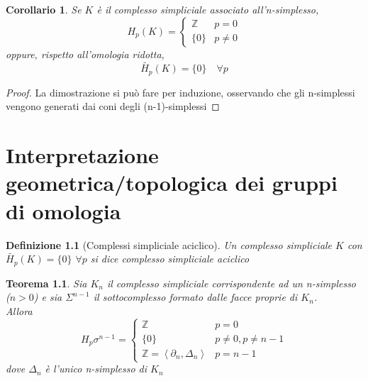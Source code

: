 \documentclass[a4paper]{report}
\newtheorem{theorem}{Teorema}
\newtheorem{definition}{Definizione}
\newtheorem{corollary}{Corollario}
\newcommand{\Z}{\ensuremath{\mathbb{Z}}}
\newcommand{\gen}[1]{\ensuremath{\left<{#1}\right>}}
\begin{document}
\begin{corollary}
    Se $K$ è il complesso simpliciale associato all'n-simplesso,
    \[
        H_p(K)=\begin{cases}
            \Z    & p=0     \\
            \{0\} & p\neq 0
        \end{cases}
    \]
    oppure, rispetto all'omologia ridotta,
    \[
        \tilde{H_p}(K)=\{0\}\quad \forall p
    \]
\end{corollary}
\begin{proof}
    La dimostrazione si può fare per induzione, osservando che gli n-simplessi vengono generati dai coni degli (n-1)-simplessi
\end{proof}
\chapter{Interpretazione geometrica/topologica dei gruppi di omologia}
\begin{definition}[Complessi simpliciale aciclico]
    Un complesso simpliciale $K$ con $\tilde{H_p}(K)=\{0\}$ $\forall p$ si dice complesso simpliciale aciclico
\end{definition}
\begin{theorem}
    Sia $K_n$ il complesso simpliciale corrispondente ad un n-simplesso ($n>0$) e sia $\Sigma^{n-1}$ il sottocomplesso formato dalle facce proprie di $K_n$.\\
    Allora
    \[
        H_p{\sigma^{n-1}}=\begin{cases}
            \Z                           & p=0              \\
            \{0\}                        & p\neq0,p\neq n-1 \\
            \Z=\gen{\partial_n,\Delta_n} & p=n-1
        \end{cases}
    \]
    dove $\Delta_n$ è l'unico n-simplesso di $K_n$
\end{theorem}
\end{document}

